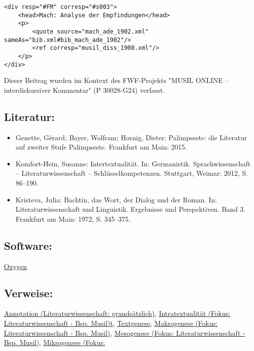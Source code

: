\documentclass{article}
\begin{document}
        \begin{verbatim}<div resp="#FM" corresp="#s003">
    <head>Mach: Analyse der Empfindungen</head>
    <p>
        <quote source="mach_ade_1902.xml" sameAs="bib.xml#bib_mach_ade_1902"/>
        <ref corresp="musil_diss_1908.xml"/>
    </p>
</div>\end{verbatim}Dieser Beitrag wurden im Kontext des FWF-Projekts "MUSIL ONLINE – interdiskursiver Kommentar" 
                  (P 30028-G24) verfasst.\subsection*{Literatur:}\begin{itemize}\item Genette, Gérard; Bayer, Wolfram; Hornig, Dieter: Palimpseste: die Literatur auf zweiter Stufe Palimpseste. Frankfurt am Main: 2015.\item Komfort-Hein, Susanne: Intertextualität. In: Germanistik. Sprachwissenschaft – Literaturwissenschaft
                              – Schlüsselkompetenzen. Stuttgart, Weimar: 2012, S. 86–190.\item Kristeva, Julia: Bachtin, das Wort, der Dialog und der Roman. In: Literaturwissenschaft und Linguistik. Ergebnisse und
                              Perspektiven. Band 3. Frankfurt am Main: 1972, S. 345–375.\end{itemize}\subsection*{Software:}\href{http://oxygenxml.com/}{Oxygen}\subsection*{Verweise:}\href{https://gams.uni-graz.at/o:konde.17}{Annotation (Literaturwissenschaft:
                           grundsätzlich)}, \href{https://gams.uni-graz.at/o:konde.21}{Intratextualität (Fokus:
                           Literaturwissenschaft - Bsp. Musil)t}, \href{https://gams.uni-graz.at/o:konde.28}{Textgenese}, \href{https://gams.uni-graz.at/o:konde.23}{Makrogenese (Fokus:
                           Literaturwissenschaft - Bsp. Musil)}, \href{https://gams.uni-graz.at/o:konde.24}{Mesogenese (Fokus:
                           Literaturwissenschaft - Bsp. Musil)}, \href{https://gams.uni-graz.at/o:konde.26}{Mikrogenese (Fokus:
}
\end{document}
